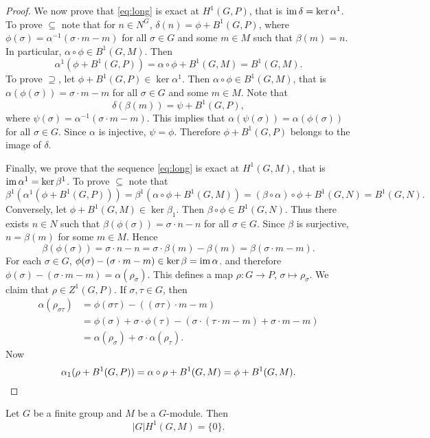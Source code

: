 \begin{proof}
    We now prove that \eqref{eq:long} is exact at $H^1(G,P)$, that 
    is $\operatorname{im}\delta=\ker\alpha^1$. To prove
    $\subseteq$ note that 
    for $n\in N^G$, $\delta(n)=\phi+B^1(G,P)$, where 
    $\phi(\sigma)=\alpha^{-1}(\sigma\cdot m-m)$ for all $\sigma\in G$
    and some $m\in M$ such that $\beta(m)=n$. In particular, 
    $\alpha\circ\phi\in B^1(G,M)$. 
    Then
    \[
    \alpha^1(\phi+B^1(G,P))=\alpha\circ\phi+B^1(G,M)=B^1(G,M).
    \]
    To prove $\supseteq$, let $\phi+B^1(G,P)\in\ker\alpha^1$. Then
    $\alpha\circ\phi\in B^1(G,M)$, that is $\alpha(\phi(\sigma))=\sigma\cdot m-m$ for 
    all $\sigma\in G$ and some $m\in M$. Note that 
    \[
    \delta(\beta(m))=\psi+B^1(G,P),
    \]
    where $\psi(\sigma)=\alpha^{-1}(\sigma\cdot m-m)$. This implies that 
    $\alpha(\psi(\sigma))=\alpha(\phi(\sigma))$ for all $\sigma\in G$. Since 
    $\alpha$ is injective, $\psi=\phi$. Therefore 
    $\phi+B^1(G,P)$ belongs to the image of $\delta$. 

    Finally, we prove that the sequence \eqref{eq:long} is exact
    at $H^1(G,M)$, that is $\operatorname{im}\alpha^1=\ker\beta^1$. To prove $\subseteq$  
    note that 
    \[
    \beta^1(\alpha^1(\phi+B^1(G,P)))=\beta^1(\alpha\circ\phi+B^1(G,M))
    =(\beta\circ\alpha)\circ\phi+B^1(G,N)=B^1(G,N).
    \]
    Conversely, let $\phi+B^1(G,M)\in\ker\beta_1$. Then $\beta\circ\phi\in B^1(G,N)$. Thus
    there exists $n\in N$ such that $\beta(\phi(\sigma))=\sigma\cdot n-n$ 
    for all $\sigma\in G$. Since $\beta$ is surjective, 
    $n=\beta(m)$ for some $m\in M$. Hence 
    \[
    \beta(\phi(\sigma))=\sigma\cdot n-n=\sigma\cdot \beta(m)-\beta(m)
    =\beta(\sigma\cdot m-m).
    \]
    For each $\sigma\in G$, 
    $\phi(\sigma)-(\sigma\cdot m-m)\in\ker\beta=\operatorname{im}\alpha$. 
    and therefore  $\phi(\sigma)-(\sigma\cdot m-m)=\alpha(\rho_\sigma)$. 
    This defines a map $\rho\colon G\to P$, $\sigma\mapsto\rho_\sigma$.
    We claim that $\rho\in Z^1(G,P)$. If $\sigma,\tau\in G$, then
    \begin{align*}    
    \alpha(\rho_{\sigma\tau})&=\phi(\sigma\tau)-( (\sigma\tau)\cdot m-m)\\
    &=\phi(\sigma)+\sigma\cdot\phi(\tau)-(\sigma\cdot (\tau\cdot m-m)+\sigma\cdot m-m)\\
    &=\alpha(\rho_\sigma)+\sigma\cdot\alpha(\rho_\tau).
    \end{align*}
    Now
    \[
    \alpha_1(\rho+B^1(G,P))=\alpha\circ\rho+B^1(G,M)=\phi+B^1(G,M).\qed
    \]
\end{proof}

\begin{theorem}
    Let $G$ be a finite group and $M$ be a $G$-module. 
    Then 
    \[
    |G|H^1(G,M)=\{0\}.
    \]
\end{theorem}

